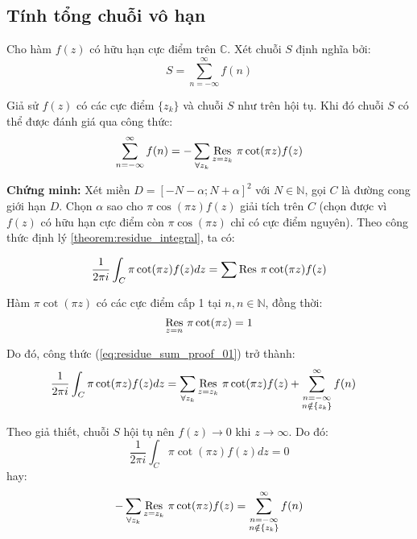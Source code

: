 \subsection{Tính tổng chuỗi vô hạn}%
\label{sub:tính_tổng_chuỗi_vô_hạn}

Cho hàm $f(z)$ có hữu hạn cực điểm trên $\mathbb C$. Xét chuỗi $S$ định nghĩa bởi:
\begin{equation}
	\label{eq:infsum_sum}
	S = \sum_{n = -\infty}^{\infty} f(n)
\end{equation}

\begin{theorem}
	\label{theorem:residue_sum}
	Giả sử $f(z)$ có các cực điểm $\{z_k\}$ và chuỗi $S$ như trên hội tụ. Khi đó chuỗi $S$ có thể được đánh giá qua công thức:
	\begin{equation*}
		\sum_{n = -\infty}^{\infty} f(n) = - \sum_{\forall z_k} \Res{\pi \cot(\pi z)f(z)}{z=z_k}
	\end{equation*}
\end{theorem}

\textbf{Chứng minh:} Xét miền $D = [-N-\alpha; N + \alpha]^2$ với $N \in \mathbb N$, gọi $C$ là đường cong giới hạn $D$. Chọn $\alpha$ sao cho $\pi\cos(\pi z)f(z)$ giải tích trên $C$ (chọn được vì $f(z)$ có hữu hạn cực điểm còn $\pi\cos(\pi z)$ chỉ có cực điểm nguyên). Theo công thức định lý \ref{theorem:residue_integral}, ta có:



\begin{equation}
	\label{eq:residue_sum_proof_01}
	\frac{1}{2\pi i}\int_C \pi \cot(\pi z)f(z) dz = \sum \Res{\pi \cot(\pi z) f(z)}{}
\end{equation}

Hàm $\pi \cot(\pi z)$ có các cực điểm cấp 1 tại $n, n\in\mathbb N$, đồng thời:
\begin{equation}
	\label{eq:residue_sum_proof_02}
	\Res{\pi\cot(\pi z)}{z=n} = 1
\end{equation}

Do đó, công thức (\ref{eq:residue_sum_proof_01}) trở thành:
\begin{align}
	\label{eq:residue_sum_proof_03}
	\frac{1}{2\pi i}\int_C \pi \cot(\pi z)f(z) dz &= \sum_{\forall z_k} \Res{\pi \cot(\pi z) f(z)}{z=z_k} + \sum_{\substack{n = -\infty\\n\notin \{z_k\}}}^{\infty} f(n)
\end{align}

Theo giả thiết, chuỗi $S$ hội tụ nên $f(z) \to 0$ khi $z\to \infty$. Do đó:
\begin{equation}
	\frac{1}{2\pi i}\int_C \pi \cot(\pi z)f(z) dz = 0
\end{equation}
hay:
\begin{equation}
	-\sum_{\forall z_k} \Res{\pi \cot(\pi z) f(z)}{z=z_k} = \sum_{\substack{n = -\infty\\n\notin \{z_k\}}}^{\infty} f(n)
\end{equation}

